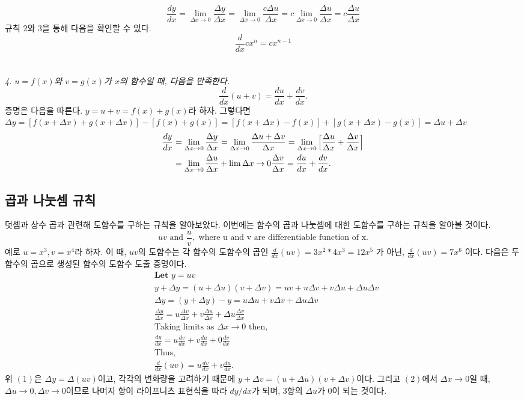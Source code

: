 \documentclass{article}
\begin{document}
\[
    \frac{dy}{dx}=\lim_{\Delta x \to 0}\frac{\Delta y}{\Delta x} = \lim_{\Delta x \to 0}\frac{c\Delta u}{\Delta x}=c\lim_{\Delta x \to 0}\frac{\Delta u}{\Delta x}=c\frac{\Delta u}{\Delta x} 
\]
규칙 2와 3을 통해 다음을 확인할 수 있다.  
\[
    \frac{d}{dx}cx^n=cx^{n-1}
\]
\\\\
\textit{4. $u=f(x)$와 $v=g(x)$가 $x$의 함수일 때, 다음을 만족한다.}
\[
    \frac{d}{dx}(u+v)=\frac{du}{dx}+\frac{dv}{dx}.
\]
증명은 다음을 따른다. $y= u+v = f(x)+g(x)$라 하자. 그렇다면 $\Delta y=[f(x+\Delta x)+g(x+\Delta x)]-[f(x)+g(x)]= [f(x+\Delta x)-f(x)] + [g(x + \Delta x)-g(x)] = \Delta u + \Delta v$
\begin{align*}
    \frac{dy}{dx}&=\lim_{\Delta x \to 0}\frac{\Delta y}{\Delta x} = \lim_{\Delta x \to 0}\frac{\Delta u + \Delta v}{\Delta x}= \lim_{\Delta x \to 0}\Big{[}\frac{\Delta u}{\Delta x}+\frac{\Delta v}{\Delta x}\Big{]}\\
                 &=\lim_{\Delta x \to 0}\frac{\Delta u}{\Delta x} + \lim{\Delta x \to 0}\frac{\Delta v}{\Delta x}= \frac{du}{dx}+\frac{dv}{dx}.
\end{align*}

\subsection{곱과 나눗셈 규칙}

덧셈과 상수 곱과 관련해 도함수를 구하는 규칙을 알아보았다. 이번에는 함수의 곱과 나눗셈에 대한 도함수를 구하는 규칙을 알아볼 것이다.\\
\[
    uv \text{ and } \frac{u}{v}, \text{ where u and v are differentiable function of x.}
\]
예로 $u=x^3, v=x^4$라 하자. 이 때, $uv$의 도함수는 각 함수의 도함수의 곱인 $\frac{d}{dx}(uv) = 3x^2 * 4x^3 = 12x^5$ 가 아닌, $\frac{d}{dx}(uv) = 7x^6$ 이다. 
다음은 두 함수의 곱으로 생성된 함수의 도함수 도출 증명이다. 
\begin{align*}
    &\textbf{Let } y=uv\\
    &y+\Delta y = (u+\Delta u)(v+\Delta v) = uv + u\Delta v + v\Delta u + \Delta u \Delta v\tag{1}\\
    &\Delta y = (y+\Delta y)- y = u\Delta u + v\Delta v + \Delta u\Delta v\\
    &\frac{\Delta y}{\Delta x} = u\frac{\Delta v}{\Delta x} + v\frac{\Delta u}{\Delta x} + \Delta u\frac{\Delta v}{\Delta x}\\
    &\text{Taking limits as } \Delta x \to 0 \text{ then, }\\
    &\frac{dy}{dx} = u\frac{dv}{dx} + v\frac{du}{dx} + 0\frac{dv}{dx}\tag{2}\\
    &\text{Thus, }\\
    &\frac{d}{dx}(uv) = u\frac{dv}{dx} + v\frac{du}{dx}.
\end{align*}
위 $(1)$은 $\Delta y = \Delta (uv)$이고, 각각의 변화량을 고려하기 때문에 $y+\Delta v = (u+\Delta u)(v+\Delta v)$이다. 그리고 $(2)$에서 $\Delta x \to 0$일 때, $\Delta u \to 0, \Delta v \to 0$이므로 나머지 항이 라이프니츠 표현식을 따라 $dy/dx$가 되며, 3항의 $\Delta u$가 $0$이 되는 것이다.
\end{document}
